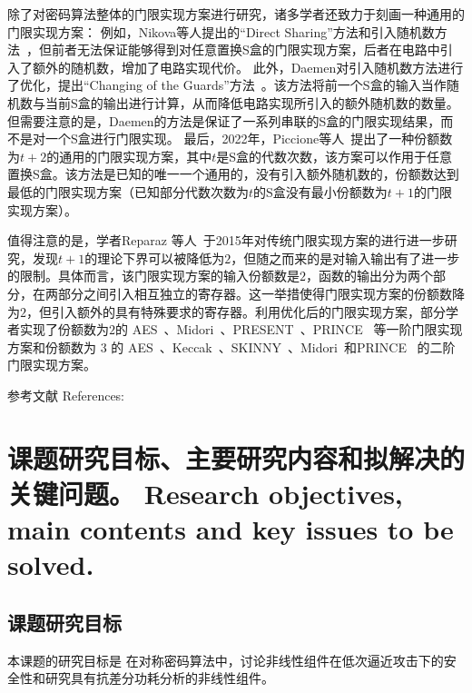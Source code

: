 \documentclass[a4paper,zihao=-4,AutoFakeBold]{ctexart}
\begin{document}
除了对密码算法整体的门限实现方案进行研究，诸多学者还致力于刻画一种通用的门限实现方案：
例如，Nikova等人提出的``Direct Sharing''方法和引入随机数方法~\cite{NikovaRSJoC11}，但前者无法保证能够得到对任意置换S盒的门限实现方案，后者在电路中引入了额外的随机数，增加了电路实现代价。
此外，Daemen对引入随机数方法进行了优化，提出``Changing of the Guards''方法~\cite{DaemenCHES17}。该方法将前一个S盒的输入当作随机数与当前S盒的输出进行计算，从而降低电路实现所引入的额外随机数的数量。但需要注意的是，Daemen的方法是保证了一系列串联的S盒的门限实现结果，而不是对一个S盒进行门限实现。
最后，2022年，Piccione等人~\cite{Piccione23TI_tp2}提出了一种份额数为$t+2$的通用的门限实现方案，其中$t$是S盒的代数次数，该方案可以作用于任意置换S盒。该方法是已知的唯一一个通用的，没有引入额外随机数的，份额数达到最低的门限实现方案（已知部分代数次数为$t$的S盒没有最小份额数为$t+1$的门限实现方案）。

值得注意的是，学者Reparaz 等人~\cite{Reparaz15}于2015年对传统门限实现方案的进行进一步研究，发现$t+1$的理论下界可以被降低为$2$，但随之而来的是对输入输出有了进一步的限制。具体而言，该门限实现方案的输入份额数是$2$，函数的输出分为两个部分，在两部分之间引入相互独立的寄存器。这一举措使得门限实现方案的份额数降为$2$，但引入额外的具有特殊要求的寄存器。利用优化后的门限实现方案，部分学者实现了份额数为$2$的 AES~\cite{ShahmirzadiBMeprint21}、Midori~\cite{ShahmirzadiMTCHES21}、PRESENT~\cite{Reparaz15}、PRINCE~\cite{MeyerBRTCHES19} 等一阶门限实现方案和份额数为 3 的 AES~\cite{SugawaraTCHES19,}、Keccak~\cite{zarei2021low}、SKINNY~\cite{shahmirzadi2021second}、Midori~\cite{shahmirzadi2023low}和PRINCE~\cite{shahmirzadi2021second} 的二阶门限实现方案。

\vspace{2\baselineskip}
{
    \linespread{1.25}\selectfont%
    参考文献 References:
    \printbibliography[heading=none]
}


\section{课题研究目标、主要研究内容和拟解决的关键问题。
  Research objectives, main contents and key issues to be solved.}
\subsection{课题研究目标}
本课题的研究目标是
在对称密码算法中，讨论非线性组件在低次逼近攻击下的安全性和研究具有抗差分功耗分析的非线性组件。

\end{document}
